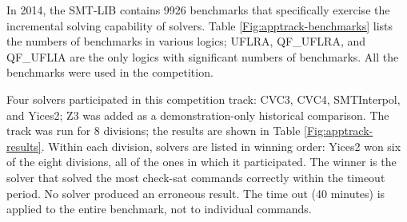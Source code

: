 \documentclass[twoside,11pt]{article}
\begin{document}
In 2014, the SMT-LIB contains 9926 benchmarks that  specifically  exercise the incremental solving capability of solvers. Table \ref{Fig:apptrack-benchmarks} lists the numbers of benchmarks in various logics; UFLRA, QF\_UFLRA, and QF\_UFLIA are the only logics with significant numbers of benchmarks. All the benchmarks were used in the competition.

Four solvers participated in this competition track: CVC3, CVC4, SMTInterpol, and Yices2; Z3 was added as a demonstration-only historical comparison. The track was run for 8 divisions; the results are shown in Table \ref{Fig:apptrack-results}. Within each division, solvers are listed in winning order: Yices2 won six of the eight divisions, all of the ones in which it participated. The winner is the solver that solved the most check-sat commands correctly within the timeout period. No solver produced an erroneous result. The time out (40 minutes) is applied to the entire benchmark, not to individual commands.
\end{document}
